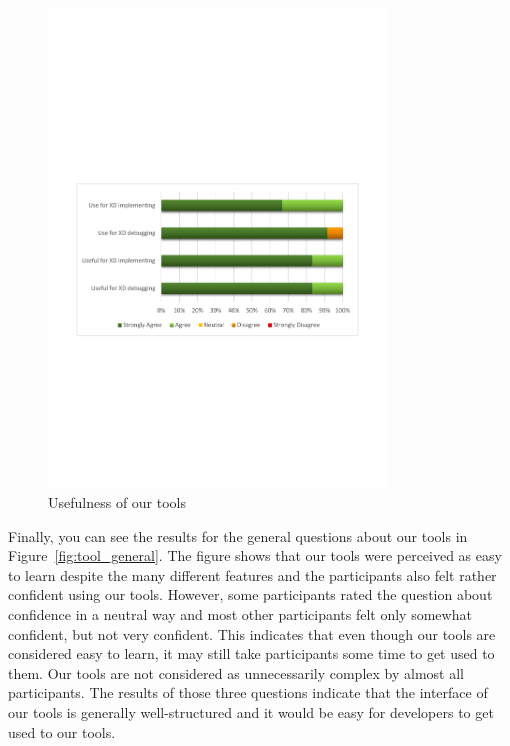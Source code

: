 \begin{figure}[H]
  \centering
    \includegraphics[width=0.8\textwidth]{images/charts/usefulness_tool.pdf}
	\caption[Usefulness]{Usefulness of our tools}
	\label{fig:usefulness_tool}
\end{figure}

Finally, you can see the results for the general questions about our tools in Figure~\ref{fig:tool_general}. The figure shows that our tools were perceived as easy to learn despite the many different features and the participants also felt rather confident using our tools. However, some participants rated the question about confidence in a neutral way and most other participants felt only somewhat confident, but not very confident. This indicates that even though our tools are considered easy to learn, it may still take participants some time to get used to them. Our tools are not considered as unnecessarily complex by almost all participants. The results of those three questions indicate that the interface of our tools is generally well-structured and it would be easy for developers to get used to our tools.

